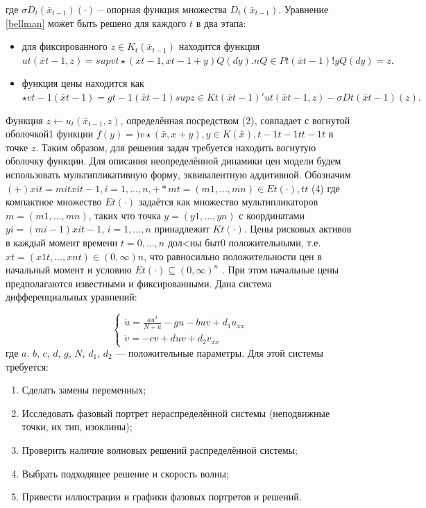 \documentclass{article}
\begin{document}
где $\sigma D_t (\bar{x}_{t-1} ) (·)$ – опорная функция множества $D_t (\bar{x}_{t-1})$. Уравнение \ref{bellman} может быть решено для каждого $t$ в два этапа:
\begin{itemize}
	\item для фиксированного $z \in K_t (\bar{x}_{t-1} )$ находится функция	$ut (\bar{x}t-1 , z) =
	sup
	vt\star (\bar{x}t-1 , xt-1 + y)Q(dy).
	n
	Q \in P
	t (\bar{x}t-1 )
	!
	yQ(dy)=z.$
	\item функция цены находится как
	$ \star
	vt-1
	(\bar{x}t-1 ) = gt-1 (\bar{x}t-1 )
	sup
	z\in Kt (\bar{x}t-1 )
	'
	ut (\bar{x}t-1 , z) - \sigma Dt (\bar{x}t-1 ) (z) .
	$
\end{itemize}
Функция $z \leftarrow u_t (\bar{x}_{t-1} ,z)$, определённая посредством (2), совпадает с вогнутой оболочкой1 функции $f (y) =
) v \star (\bar{x} , x + y), y \in K (\bar{x} ),
t-1
t-1
t t-1
t
$ в точке $z$. Таким образом,
для решения задач требуется находить вогнутую оболочку функции.
Для описания неопределённой динамики цен модели будем использовать мультипликативную форму, эквивалентную аддитивной. Обозначим
$(
+
)xit = mit xit-1 , i = 1, . . . , n,
+
*mt = (m1 , . . . , mn ) \in Et (·),
t
t$
(4)
где компактное множество $Et (·)$ задаётся как множество мультипликаторов $m =
(m1 , . . . , mn )$, таких что точка $y = (y 1 , . . . , y n )$ с координатами $y i = (mi - 1)xit-1 $,
$i = 1, . . . , n$ принадлежит $Kt (·)$. Цены рисковых активов в каждый момент времени
$t = 0, . . . , n$ дол<ны быт0 положительными, т.е. $xt = (x1t , . . . , xnt ) \in (0, \infty)n $, что равносильно положительности цен в начальный момент и условию $Et (·) \subseteq (0, \infty)^n$ . При этом
начальные цены предполагаются известными и фиксированными.
Дана система дифференциальных уравнений:

\begin{equation}
\begin{cases}\label{main:syst}
\dot u =\frac{a u^2}{N + u} - gu - buv + d_1 u_{x x}\\
\dot v = - cv + duv + d_2 v_{xx}
\end{cases}
\end{equation}
где $a$. $b$, $c$, $d$, $g$, $N$, $d_1$, $d_2$ --- положительные параметры. Для этой системы требуется:

\begin{enumerate}

\item Сделать замены переменных;

\item Исследовать фазовый портрет нераспределённой системы (неподвижные точки, их тип, изоклины);

\item Проверить наличие волновых решений распределённой системы;

\item Выбрать подходящее решение и скорость волны;

\item Привести иллюстрации и графики фазовых портретов и решений.

\end{enumerate}
\pagebreak
\end{document}
